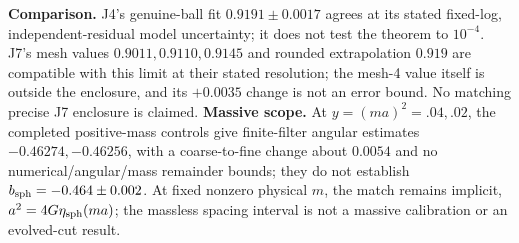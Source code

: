 \textbf{Comparison.} J4's genuine-ball fit
$0.9191\pm0.0017$ agrees at its stated fixed-log, independent-residual
model uncertainty; it does not test the theorem to $10^{-4}$.
J7's mesh values $0.9011,0.9110,0.9145$ and rounded extrapolation $0.919$
are compatible with this limit at their stated resolution; the mesh-4
value itself is outside the enclosure, and its $+0.0035$ change is not
an error bound. No matching precise J7 enclosure is claimed.
\textbf{Massive scope.} At $y=(ma)^2=.04,.02$, the completed positive-mass controls
give finite-filter angular estimates $-0.46274,-0.46256$, with a coarse-to-fine change about
$0.0054$ and no numerical/angular/mass remainder bounds; they do not
establish $b_{\rm sph}=-0.464\pm0.002$.
At fixed nonzero physical $m$, the match remains implicit,
$a^2=4G\eta_{\rm sph}(ma)$; the massless spacing interval is not a
massive calibration or an evolved-cut result.

